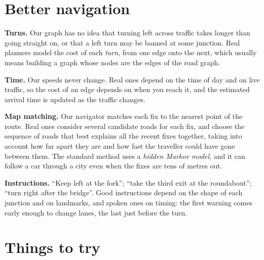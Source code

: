 \section{Better navigation}

\textbf{Turns.} Our graph has no idea that turning left across traffic
takes longer than going straight on, or that a left turn may be banned at
some junction. Real planners model the cost of each \emph{turn}, from one
edge onto the next, which usually means building a graph whose nodes are
the edges of the road graph.

\textbf{Time.} Our speeds never change. Real ones depend on the time of
day and on live traffic, so the cost of an edge depends on when you reach
it, and the estimated arrival time is updated as the traffic changes.

\textbf{Map matching.} Our navigator matches each fix to the nearest point
of the route. Real ones consider several candidate roads for each fix, and
choose the sequence of roads that best explains all the recent fixes
together, taking into account how far apart they are and how fast the
traveller could have gone between them. The standard method uses a
\emph{hidden Markov model}, and it can follow a car through a city even
when the fixes are tens of metres out.

\textbf{Instructions.} ``Keep left at the fork''; ``take the third exit at
the roundabout''; ``turn right after the bridge''. Good instructions depend
on the shape of each junction and on landmarks, and spoken ones on timing:
the first warning comes early enough to change lanes, the last just
before the turn.

\section{Things to try}

